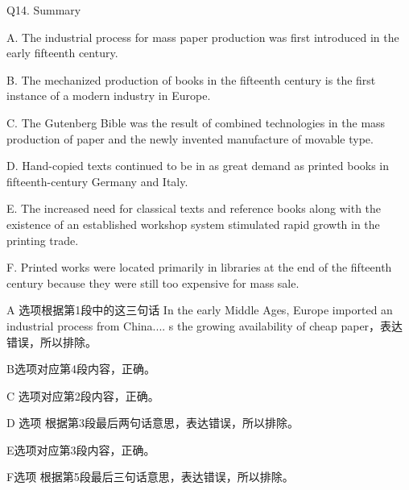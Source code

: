 \begin{blk}
    \begin{qst}
        Q14. Summary
    \end{qst}

    \begin{chc}
        A. The industrial process for mass paper production was first introduced in the early fifteenth century.

        B. The mechanized production of books in the fifteenth century is the first instance of a modern industry in Europe.

        C. The Gutenberg Bible was the result of combined technologies in the mass production of paper and the newly invented manufacture of movable type.

        D. Hand-copied texts continued to be in as great demand as printed books in fifteenth-century Germany and Italy.

        E. The increased need for classical texts and reference books along with the existence of an established workshop system stimulated rapid growth in the printing trade.

        F. Printed works were located primarily in libraries at the end of the fifteenth century because they were still too expensive for mass sale.
    \end{chc}

    \begin{nlz}
        A 选项根据第1段中的这三句话 In the early Middle Ages, Europe imported an industrial process from China.... s the growing availability of cheap paper，表达错误，所以排除。

        B选项对应第4段内容，正确。

        C 选项对应第2段内容，正确。

        D 选项 根据第3段最后两句话意思，表达错误，所以排除。

        E选项对应第3段内容，正确。

        F选项 根据第5段最后三句话意思，表达错误，所以排除。
    \end{nlz}
\end{blk}
